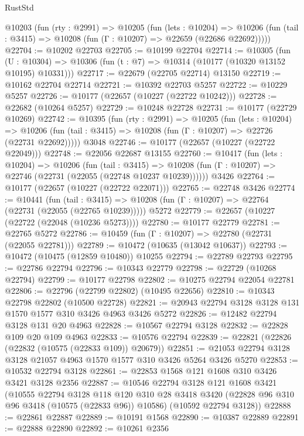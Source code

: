 \begin{lexlean}{RustStd}
\begin{coremodule}
  @10203
    (fun (rty : @2991) =>
    @10205
      (fun (lets : @10204) =>
      @10206 (fun (tail : @3415) => @10208 (fun (Γ : @10207) => @22659 (@22686 @22692)))))
@22704 := @10202 @22703
@22705 := @10199 @22704
@22714 := @10305
    (fun (U : @10304) => @10306 (fun (t : @7) => @10314 (@10177 (@10320 @13152 @10195) @10331)))
@22717 := @22679 (@22705 @22714) @13150
@22719 := @10162 @22704 @22714
@22721 := @10392 @22703 @5257
@22722 := @10229 @5257
@22726 := @10177 (@22657 (@10227 (@22722 @10242)))
@22728 := @22682 (@10264 @5257)
@22729 := @10248 @22728
@22731 := @10177 (@22729 @10269)
@22742 := @10395
    (fun (rty : @2991) =>
    @10205
      (fun (lets : @10204) =>
      @10206 (fun (tail : @3415) => @10208 (fun (Γ : @10207) => @22726 (@22731 @22692)))))
    @3048
@22746 := @10177 (@22657 (@10227 (@22722 @22049)))
@22748 := @22056 @22687 @13155
@22760 := @10417
    (fun (lets : @10204) =>
    @10206
      (fun (tail : @3415) =>
      @10208 (fun (Γ : @10207) => @22746 (@22731 (@22055 (@22748 @10237 @10239))))))
    @3426
@22764 := @10177 (@22657 (@10227 (@22722 @22071)))
@22765 := @22748 @3426
@22774 := @10441
    (fun (tail : @3415) => @10208 (fun (Γ : @10207) => @22764 (@22731 (@22055 (@22765 @10239)))))
    @5272
@22779 := @22657 (@10227 (@22722 (@22048 (@10236 @5273))))
@22780 := @10177 @22779
@22781 := @22765 @5272
@22786 := @10459 (fun (Γ : @10207) => @22780 (@22731 (@22055 @22781)))
@22789 := @10472 (@10635 (@13042 @10637))
@22793 := @10472 (@10475 (@12859 @10480)) @10255
@22794 := @22789 @22793
@22795 := @22786 @22794
@22796 := @10343 @22779
@22798 := @22729 (@10268 @22794)
@22799 := @10177 @22798
@22802 := @10275 @22794 @22054 @22781
@22806 := @22796 (@22799 @22802) (@10495 @22656)
@22810 := @10343 @22798 @22802 (@10500 @22728)
@22821 := @20943 @22794 @3128 @3128 @131 @1570 @1577 @310 @3426 @4963 @3426 @5272
@22826 := @12482 @22794 @3128 @131 @20 @4963
@22828 := @10567 @22794 @3128
@22832 := @22828 @109 @20 @109 @4963
@22833 := @10576 @22794
@22839 := @22821 (@22826 (@22832 (@10575 (@22833 @109)) @20679))
@22851 := @21053 @22794 @3128 @3128 @21057 @4963 @1570 @1577 @310 @3426 @5264 @3426 @5270
@22853 := @10532 @22794 @3128
@22861 := @22853 @1568 @121 @1608 @310 @3426 @3421 @3128 @2356
@22887 := @10546
    @22794
    @3128
    @121
    @1608
    @3421
    (@10555
      @22794
      @3128
      @118
      @120
      @310
      @28
      @3418
      @3420
      (@22828 @96 @310 @96 @3418 (@10575 (@22833 @96)) @10586)
      (@10592 @22794 @3128))
@22888 := @22861 @22887
@22889 := @10191 @1568
@22890 := @10387 @22889
@22891 := @22888 @22890
@22892 := @10261 @2356

\end{coremodule}
\end{lexlean}
